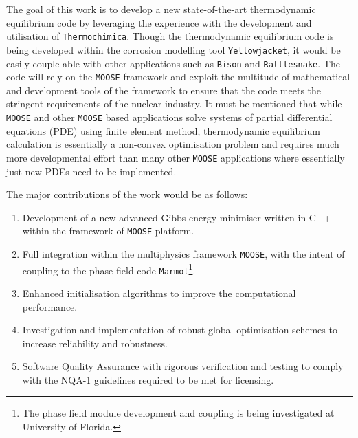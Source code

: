 	The goal of this work is to develop a new state-of-the-art thermodynamic equilibrium code by leveraging the experience with the development and utilisation of \texttt{Thermochimica}. Though the thermodynamic equilibrium code is being developed within the corrosion modelling tool \texttt{Yellowjacket}, it would be easily couple-able with other applications such as \texttt{Bison} and \texttt{Rattlesnake}. The code will rely on the \texttt{MOOSE} framework and exploit the multitude of mathematical and development tools of the framework to ensure that the code meets the stringent requirements of the nuclear industry. It must be mentioned that while \texttt{MOOSE} and other \texttt{MOOSE} based applications solve systems of partial differential equations (PDE) using finite element method, thermodynamic equilibrium calculation is essentially a non-convex optimisation problem and requires much more developmental effort than many other \texttt{MOOSE} applications where essentially just new PDEs need to be implemented.
	
	The major contributions of the work would be as follows:
	\begin{enumerate}
		\item Development of a new advanced Gibbs energy minimiser written in C++ within the framework of \texttt{MOOSE} platform.
		\item Full integration within the multiphysics framework \texttt{MOOSE}, with the intent of coupling to the phase field code \texttt{Marmot}\footnote{The phase field module development and coupling is being investigated at University of Florida.}. 
		\item Enhanced initialisation algorithms to improve the computational performance.
		\item Investigation and implementation of robust global optimisation schemes to increase reliability and robustness.
		\item Software Quality Assurance  with rigorous verification and testing to comply with the NQA-1 guidelines required to be met for licensing.
	\end{enumerate}




